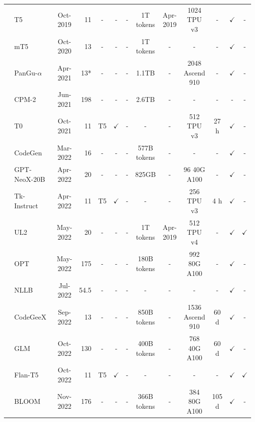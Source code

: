 \begin{table}[htbp]
\begin{tabular}{llcrccccccccc}
\midrule
  & T5~\cite{Raffel-JMLR-2020-Exploring}   & Oct-2019    & 11    & -   & - & - & {1T tokens}    & Apr-2019 & 1024 TPU v3 & -  & $\checkmark$ & -    \\
  & mT5~\cite{Xue-NAACL-2021-mT5}  & Oct-2020    & 13    & -   & - & - & 1T tokens & - & -   & -  & $\checkmark$ & - \\
  &  {PanGu-$\alpha$}~\cite{Zeng-arxiv-2021-PanGualpha}   & Apr-2021    & 13*    & -  &  - & - & 1.1TB   & -  & 2048 Ascend 910 &  -  & $\checkmark$ & - \\
  & CPM-2~\cite{Zhang-arXiv-2021-CPM-2}    & Jun-2021    & 198   & -   & - & - & {2.6TB}  & -  & - & - & -       & -    \\
  & T0~\cite{Sanh-ICLR-2022-Multitask}   & Oct-2021    & 11    & T5  & $\checkmark$  & - & -   & -  & 512 TPU v3  & 27 h   & $\checkmark$ & - \\
  & CodeGen~\cite{nijkamp-arxiv-2022-Codegen}  & Mar-2022    & 16    & -   & - & - & 577B tokens & -  & -   & -  & $\checkmark$ & -  \\
  & GPT-NeoX-20B~\cite{Black-CoRR-2022-GPT} & Apr-2022    & 20    & -   & - & - & 825GB & - & 96 40G A100 & -  & $\checkmark$ & -      \\
  & Tk-Instruct~\cite{Wang-EMNLP-2022-Super}  & Apr-2022    & 11    & T5  & $\checkmark$  & - & - & -  & 256 TPU v3   & 4 h  & $\checkmark$    & -    \\
  & UL2~\cite{Tay-arxiv-2022-UL2}  & May-2022    & 20    & -   & - & - & 1T tokens & Apr-2019 & 512 TPU v4  & -  & $\checkmark$ & $\checkmark$    \\
  & OPT~\cite{Zhang-arxiv-2022-OPT}  & May-2022    & 175   & -   & - & - & 180B tokens   & -  & 992 80G A100    & -  & $\checkmark$  & -    \\
  & NLLB~\cite{Marta-arxiv-2022-NLLB}  & Jul-2022    & 54.5   & -   & - & - & -  & -  & -   & -  & $\checkmark$  & -    \\
  & CodeGeeX~\cite{Zheng-arXiv-2023-CodeGeex}    & Sep-2022    & 13    & -   & - & - & 850B tokens   & - & 1536 Ascend 910 & 60 d   & $\checkmark$ & - \\
  & GLM~\cite{Zeng-arxiv-2022-GLM}  & Oct-2022    & 130   & -   & - & - & 400B tokens   & -  & 768 40G A100    & 60 d  & $\checkmark$ & -    \\
  & Flan-T5~\cite{Chung-arxiv-2022-Scaling}  & Oct-2022    & 11    & T5  & $\checkmark$  & - & - & -  & -   & -  & $\checkmark$ & $\checkmark$  \\
  & BLOOM~\cite{Scao-arxiv-2022-BLOOM}    & Nov-2022    & 176   & -   & - & - & 366B tokens & -  & 384 80G A100    & 105 d  &  $\checkmark$    & -    \\

\end{tabular}
\end{table}
